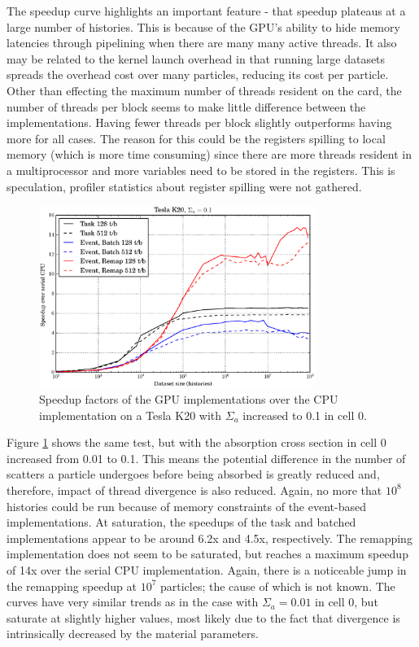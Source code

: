 The speedup curve highlights an important feature - that speedup plateaus at a large number of histories.  This is because of the GPU's ability to hide memory latencies through pipelining when there are many many active threads.  It also may be related to the kernel launch overhead in that running large datasets spreads the overhead cost over many particles, reducing its cost per particle.  Other than effecting the maximum number of threads resident on the card, the number of threads per block seems to make little difference between the implementations. Having fewer threads per block slightly outperforms having more for all cases.  The reason for this could be the registers spilling to local memory (which is more time consuming) since there are more threads resident in a multiprocessor and more variables need to be stored in the registers.  This is speculation, profiler statistics about register spilling were not gathered.  %

\begin{figure}[h!] 
  \centering
    \includegraphics[width=0.8\textwidth]{graphics/prelim_speedup_01_k20.eps}
     \caption{Speedup factors of the GPU implementations over the CPU implementation on a Tesla K20 with $\Sigma_a$ increased to 0.1 in cell 0. \label{prelim_speedup_1} }
\end{figure}

Figure \ref{prelim_speedup_1} shows the same test, but with the absorption cross section in cell 0 increased from 0.01 to 0.1.  This means the potential difference in the number of scatters a particle undergoes before being absorbed is greatly reduced and, therefore, impact of thread divergence is also reduced.  Again, no more that $10^8$ histories could be run because of memory constraints of the event-based implementations.  At saturation, the speedups of the task and batched implementations appear to be around 6.2x and 4.5x, respectively.  The remapping implementation does not seem to be saturated, but reaches a maximum speedup of 14x over the serial CPU implementation.  Again, there is a noticeable jump in the remapping speedup at $10^7$ particles; the cause of which is not known. %
 The curves have very similar trends as in the case with $\Sigma_a=0.01$ in cell 0, but saturate at slightly higher values, most likely due to the fact that divergence is intrinsically decreased by the material parameters.

